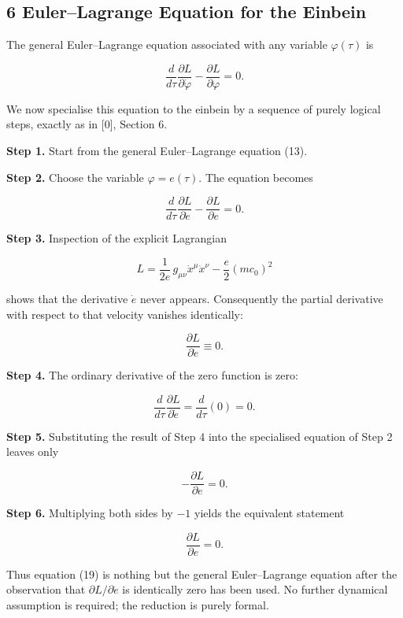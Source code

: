\documentclass[
]{article}
\begin{document}
\hypertarget{eulerlagrange-equation-for-the-einbein}{%
\subsection{6 Euler--Lagrange Equation for the
Einbein}\label{eulerlagrange-equation-for-the-einbein}}

The general Euler--Lagrange equation associated with any variable
\(\varphi(\tau)\) is

\[\frac{d}{d\tau} \frac{\partial L}{\partial \dot{\varphi}} - \frac{\partial L}{\partial \varphi} = 0. \tag{13}\]

We now specialise this equation to the einbein by a sequence of purely
logical steps, exactly as in {[}0{]}, Section 6.

\textbf{Step 1.} Start from the general Euler--Lagrange equation (13).

\textbf{Step 2.} Choose the variable \(\varphi = e(\tau)\). The equation
becomes

\[\frac{d}{d\tau} \frac{\partial L}{\partial \dot{e}} - \frac{\partial L}{\partial e} = 0. \tag{14}\]

\textbf{Step 3.} Inspection of the explicit Lagrangian

\[L = \frac{1}{2e}\, g_{\mu\nu} \dot{x}^{\mu} \dot{x}^{\nu} - \frac{e}{2}(mc_{0})^{2} \tag{15}\]

shows that the derivative \(\dot{e}\) never appears. Consequently the
partial derivative with respect to that velocity vanishes identically:

\[\frac{\partial L}{\partial \dot{e}} \equiv 0. \tag{16}\]

\textbf{Step 4.} The ordinary derivative of the zero function is zero:

\[\frac{d}{d\tau} \frac{\partial L}{\partial \dot{e}} = \frac{d}{d\tau}(0) = 0. \tag{17}\]

\textbf{Step 5.} Substituting the result of Step 4 into the specialised
equation of Step 2 leaves only

\[- \frac{\partial L}{\partial e} = 0. \tag{18}\]

\textbf{Step 6.} Multiplying both sides by \(-1\) yields the equivalent
statement

\[\frac{\partial L}{\partial e} = 0. \tag{19}\]

Thus equation (19) is nothing but the general Euler--Lagrange equation
after the observation that \(\partial L / \partial \dot{e}\) is
identically zero has been used. No further dynamical assumption is
required; the reduction is purely formal.
\end{document}
